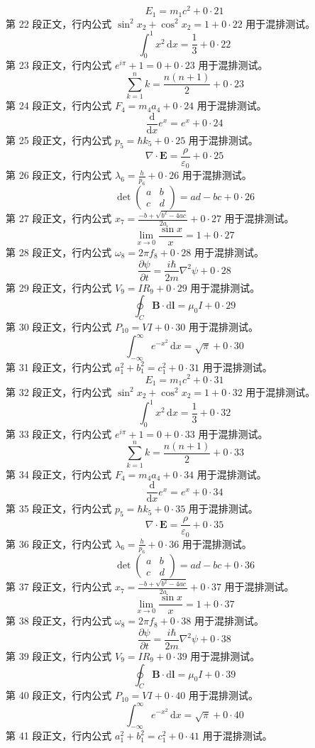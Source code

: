 $$E_1=m_1c^2+0\cdot21$$
第 22 段正文，行内公式 $\sin^2 x_2+\cos^2 x_2=1+0\cdot22$ 用于混排测试。
$$\int_0^1 x^2\,\mathrm{d}x=\frac13+0\cdot22$$
第 23 段正文，行内公式 $e^{i\pi}+1=0+0\cdot23$ 用于混排测试。
$$\sum_{k=1}^{n} k=\frac{n(n+1)}2+0\cdot23$$
第 24 段正文，行内公式 $F_4=m_4a_4+0\cdot24$ 用于混排测试。
$$\frac{\mathrm{d}}{\mathrm{d}x}e^x=e^x+0\cdot24$$
第 25 段正文，行内公式 $p_5=\hbar k_5+0\cdot25$ 用于混排测试。
$$\nabla\cdot\mathbf{E}=\frac{\rho}{\varepsilon_0}+0\cdot25$$
第 26 段正文，行内公式 $\lambda_6=\frac{h}{p_6}+0\cdot26$ 用于混排测试。
$$\det\begin{pmatrix}a&b\\c&d\end{pmatrix}=ad-bc+0\cdot26$$
第 27 段正文，行内公式 $x_7=\frac{-b+\sqrt{b^2-4ac}}{2a}+0\cdot27$ 用于混排测试。
$$\lim_{x\to0}\frac{\sin x}{x}=1+0\cdot27$$
第 28 段正文，行内公式 $\omega_8=2\pi f_8+0\cdot28$ 用于混排测试。
$$\frac{\partial \psi}{\partial t}=\frac{i\hbar}{2m}\nabla^2\psi+0\cdot28$$
第 29 段正文，行内公式 $V_9=IR_9+0\cdot29$ 用于混排测试。
$$\oint_C \mathbf{B}\cdot\mathrm{d}\mathbf{l}=\mu_0 I+0\cdot29$$
第 30 段正文，行内公式 $P_{10}=VI+0\cdot30$ 用于混排测试。
$$\int_{-\infty}^{\infty}e^{-x^2}\,\mathrm{d}x=\sqrt{\pi}+0\cdot30$$
第 31 段正文，行内公式 $a_1^2+b_1^2=c_1^2+0\cdot31$ 用于混排测试。
$$E_1=m_1c^2+0\cdot31$$
第 32 段正文，行内公式 $\sin^2 x_2+\cos^2 x_2=1+0\cdot32$ 用于混排测试。
$$\int_0^1 x^2\,\mathrm{d}x=\frac13+0\cdot32$$
第 33 段正文，行内公式 $e^{i\pi}+1=0+0\cdot33$ 用于混排测试。
$$\sum_{k=1}^{n} k=\frac{n(n+1)}2+0\cdot33$$
第 34 段正文，行内公式 $F_4=m_4a_4+0\cdot34$ 用于混排测试。
$$\frac{\mathrm{d}}{\mathrm{d}x}e^x=e^x+0\cdot34$$
第 35 段正文，行内公式 $p_5=\hbar k_5+0\cdot35$ 用于混排测试。
$$\nabla\cdot\mathbf{E}=\frac{\rho}{\varepsilon_0}+0\cdot35$$
第 36 段正文，行内公式 $\lambda_6=\frac{h}{p_6}+0\cdot36$ 用于混排测试。
$$\det\begin{pmatrix}a&b\\c&d\end{pmatrix}=ad-bc+0\cdot36$$
第 37 段正文，行内公式 $x_7=\frac{-b+\sqrt{b^2-4ac}}{2a}+0\cdot37$ 用于混排测试。
$$\lim_{x\to0}\frac{\sin x}{x}=1+0\cdot37$$
第 38 段正文，行内公式 $\omega_8=2\pi f_8+0\cdot38$ 用于混排测试。
$$\frac{\partial \psi}{\partial t}=\frac{i\hbar}{2m}\nabla^2\psi+0\cdot38$$
第 39 段正文，行内公式 $V_9=IR_9+0\cdot39$ 用于混排测试。
$$\oint_C \mathbf{B}\cdot\mathrm{d}\mathbf{l}=\mu_0 I+0\cdot39$$
第 40 段正文，行内公式 $P_{10}=VI+0\cdot40$ 用于混排测试。
$$\int_{-\infty}^{\infty}e^{-x^2}\,\mathrm{d}x=\sqrt{\pi}+0\cdot40$$
第 41 段正文，行内公式 $a_1^2+b_1^2=c_1^2+0\cdot41$ 用于混排测试。
